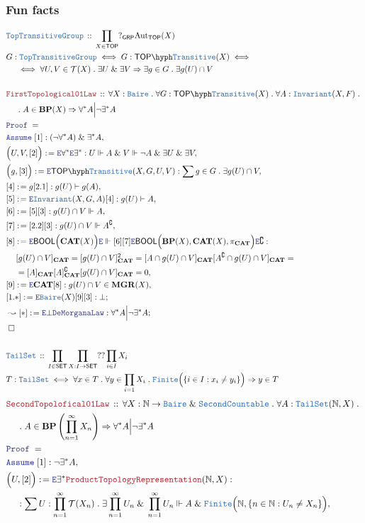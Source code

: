 \documentclass[12pt]{scrartcl}
\newcommand{\TYPE}[1]{\textcolor{NavyBlue}{\mathtt{#1}}}
\newcommand{\LOGIC}[1]{\textcolor{Blue}{\mathtt{#1}}}
\newcommand{\THM}[1]{\textcolor{Maroon}{\mathtt{#1}}}
\renewcommand{\.}{\; . \;}
\newcommand{\de}{: \kern 0.1pc =}
\newcommand{\Theorem}[2]{& \THM{#1} \, :: \, #2 \\ & \Proof = \\ }
\newcommand{\DeclareType}[2]{& \TYPE{#1} \, :: \, #2 \\}
\newcommand{\DefineType}[3]{& #1 : \TYPE{#2} \iff #3 \\}
\newcommand{\DefineNamedType}[4]{& #1 : \TYPE{#2} \iff #3 \iff #4 \\}
\newcommand{\NewLine}{\\ & \kern 1pc}
\newcommand{\Page}[1]{ \begin{align*} #1 \end{align*}   }
\renewcommand{\And}{\; \& \;}
\newcommand{\Imply}{\Rightarrow}
\newcommand{\Elim}{\LOGIC{E}}
\newcommand{\Nat}{\mathbb{N} }
\newcommand{\Aut}{\mathrm{Aut}}
\renewcommand{\c}{\complement}
\newcommand{\Say}[3]{& #1 \de #2 : #3, \\}
\newcommand{\Conclude}[3]{& #1 \de #2 : #3; \\}
\newcommand{\DeriveConclude}[3]{& \leadsto #1 \de #2 : #3 ; \\}
\newcommand{\Assume}[2]{& \LOGIC{Assume} \; #1 : #2, \\}
\newcommand{\QED}{\; \square}
\newcommand{\EndProof}{& \QED \\}
\newcommand{\Proof}{\LOGIC{Proof} \; }
\newcommand{\Finite}{\TYPE{Finite}}
\newcommand{\SET}{\mathsf{SET}}
\newcommand{\GRP}{\mathsf{GRP}}
\newcommand{\Bair}{\TYPE{Baire}}
\newcommand{\TOP}{\mathsf{TOP}}
\newcommand{\T}{\mathcal{T}}
\newcommand{\BOOL}{\mathsf{BOOL}}
\newcommand{\BP}{\mathbf{BP}}
\newcommand{\MGR}{\mathbf{MGR}}
\newcommand{\cat}{\mathbf{CAT}}
\begin{document}
\subsubsection{Fun facts}
\Page{
	\DeclareType{TopTransitiveGroup}{\prod_{X \in \TOP}?_\GRP \Aut_\TOP(X)}
	\DefineNamedType{G}{TopTransitiveGroup}{G : \TOP\hyph\TYPE{Transitive}(X)}
	{
		\NewLine \iff		
		\forall U,V \in \T(X) \. \exists U \And \exists V \Imply 
		\exists g \in G \.  \exists g(U) \cap V
	}
	\\
	\Theorem{FirstTopological01Law}
	{
		\forall X : \Bair \.
		\forall G : \TOP\hyph\TYPE{Transitive}(X) \.
		\forall A : \TYPE{Invariant}(X,F) \.
		\NewLine \.
		A \in \BP(X)
		\Imply
		\forall^* A \Big| \neg \exists^* A
	}
	\Assume{[1]}{(\neg \forall^* A) \And \exists^* A}
	\Say{\Big(U,V,[2]\Big)}{\Elim \forall^* \Elim \exists^*}
	{
		U \Vdash A \And V \Vdash \neg A \And \exists U \And \exists V
	}
	\Say{\Big(g,[3]\Big)}{\Elim \TOP\hyph\TYPE{Transitive}(X,G,U,V)}
	{
		\sum g \in G \. \exists g(U) \cap V
	}
	\Say{[4]}{g[2.1]}
	{
			g(U) \vdash g(A)
	}
	\Say{[5]}{\Elim \TYPE{Invariant}(X,G,A)[4]}
	{
		g(U) \vdash A 	
	}
	\Say{[6]}{[5][3]}{g(U) \cap V \Vdash A}
	\Say{[7]}{[2.2][3]}{g(U) \cap V \Vdash A^\c}
	\Say{[8]}{
		\Elim \BOOL\Big( \cat(X) \Big)
		\Elim \Vdash [6][7]
		\Elim \BOOL\Big( \BP(X), \cat(X),   \pi_\cat \Big)
		\Elim \c	
	}{  
			\NewLine 			
			[g(U) \cap V]_\cat =
			[g(U) \cap V]_\cat^2 =  
			[A \cap g(U) \cap V]_\cat[A^\c \cap  g(U) \cap V]_\cat =  \NewLine =
			[A]_\cat [A]^\c_\cat [g(U) \cap V]_\cat = 0   
	}
	\Say{[9]}{\Elim \cat [8]}{g(U) \cap V \in \MGR(X)}
	\Conclude{[1.*]}{\Elim \Bair(X)[9][3]}{\bot}
	\DeriveConclude{[*]}{\Elim \bot \LOGIC{DeMorganaLaw}}
	{
		\forall^* A \Big| \neg \exists^* A
	}
	\EndProof
	\\
	\DeclareType{TailSet}
	{
		\prod_{I \in \SET} \prod_{X : I \to \SET} ??\prod_{i \in I} X_i
	}
	\DefineType{T}{TailSet}{
		\forall x \in T \. 
		\forall y \in \prod_{i=1} X_i\.
		\TYPE{Finite}\Big(\{ i \in I : x_i \neq y_i   \}\Big) \Imply
		y \in T
	}
}\Page{
	\Theorem{SecondTopolofical01Law}
	{
		\forall X : \Nat \to \Bair \And \TYPE{SecondCountable} \.
		\forall A : \TYPE{TailSet}(\Nat,X) \. 
		\NewLine \.
		A \in \BP\left( \prod^\infty_{n=1} X_n\right) 
		\Imply
		\forall^* A \Big| \neg \exists^* A
	}
	\Assume{[1]}{\neg \exists^* A}
	\Say{\Big( U, [2]  \Big)}
	{
		\Elim \exists^*
		\THM{ProductTopologyRepresentation}(\Nat,X)
	}
	{
		\NewLine :		
		\sum U : \prod^\infty_{n=1} \T(X_n) \.
		\exists \prod^\infty_{n=1} U_n
		\And  \prod^\infty_{n=1} U_n \Vdash A 
		\And \Finite\Big(\Nat,\{ n \in \Nat : U_n \neq X_n   \}\Big)
}}
\end{document}
